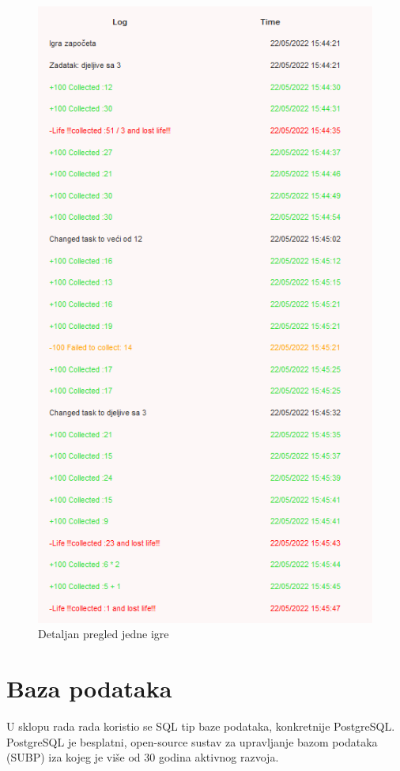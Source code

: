 \documentclass[times, utf8, zavrsni, numeric]{fer}
\begin{document}
	\begin{figure}[H]
		\includegraphics[scale = 0.9]{"slike/detaljanpregledrezultata.png"} 
		\centering
		\caption{Detaljan pregled jedne igre}
		\label{fig:pregledjedneigre}
	\end{figure}
	
	
	\chapter{Baza podataka}
	 U sklopu rada rada koristio se SQL tip baze podataka, konkretnije PostgreSQL. PostgreSQL je besplatni, open-source sustav za upravljanje bazom podataka (SUBP) iza kojeg je više od 30 godina aktivnog razvoja. \cite{postgresql}
	
\end{document}
